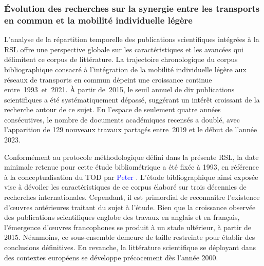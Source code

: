 \begin{refsegment}
\subsubsection*{Évolution des recherches sur la synergie entre les transports en commun et la mobilité individuelle légère
    \label{chap2:evolution-recherches-tc-mobilite-individuelle-legere}
    }
    
L'analyse de la répartition temporelle des publications scientifiques intégrées à la \acrshort{RSL} offre une perspective globale sur les caractéristiques et les avancées qui délimitent ce corpus de littérature. La trajectoire chronologique du corpus bibliographique consacré à l'intégration de la mobilité individuelle légère aux réseaux de transports en commun dépeint une croissance continue entre~1993~et~2021. À partir de~2015, le seuil annuel de dix publications scientifiques a été systématiquement dépassé, suggérant un intérêt croissant de la recherche autour de ce sujet. En l'espace de seulement quatre années consécutives, le nombre de documents académiques recensés a doublé, avec l'apparition de 129 nouveaux travaux partagés entre~2019 et le début de l'année 2023.%

Conformément au protocole méthodologique défini dans la présente \acrshort{RSL}, la date minimale retenue pour cette étude bibliométrique a été fixée à 1993, en référence à la conceptualisation du \acrshort{TOD} par \textcolor{blue}{Peter} \textcolor{blue}{\textcite{calthorpe_next_1993}}. L'étude bibliographique ainsi exposée vise à dévoiler les caractéristiques de ce corpus élaboré sur trois décennies de recherches internationales. Cependant, il est primordial de reconnaître l'existence d'œuvres antérieures traitant du sujet à l'étude. Bien que la croissance observée des publications scientifiques englobe des travaux en anglais et en français, l'émergence d'œuvres francophones se produit à un stade ultérieur, à partir de 2015. Néanmoins, ce sous-ensemble demeure de taille restreinte pour établir des conclusions définitives. En revanche, la littérature scientifique se déployant dans des contextes européens se développe précocement dès l'année 2000.%


\end{refsegment}
